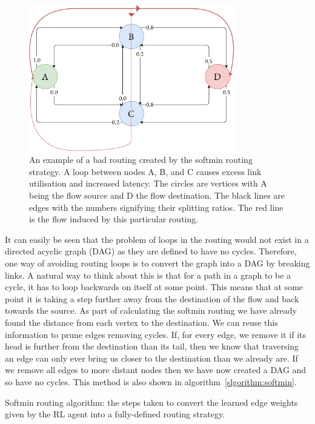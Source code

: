 \begin{figure}
    \centering
    \includegraphics[width=0.8\textwidth]{figures/bad_route.pdf}
    \caption{An example of a bad routing created by the softmin routing strategy. A loop between nodes A, B, and C causes excess link utilisation and increased latency. The circles are vertices with A being the flow source and D the flow destination. The black lines are edges with the numbers signifying their splitting ratios. The red line is the flow induced by this particular routing.}
    \label{fig:bad_route}
\end{figure}

It can easily be seen that the problem of loops in the routing would not exist in a directed acyclic graph (DAG) as they are defined to have no cycles. Therefore, one way of avoiding routing loops is to convert the graph into a DAG by breaking links. A natural way to think about this is that for a path in a graph to be a cycle, it has to loop backwards on itself at some point. This means that at some point it is taking a step further away from the destination of the flow and back towards the source. As part of calculating the softmin routing we have already found the distance from each vertex to the destination. We can reuse this information to prune edges removing cycles. If, for every edge, we remove it if its head is further from the destination than its tail, then we know that traversing an edge can only ever bring us closer to the destination than we already are. If we remove all edges to more distant nodes then we have now created a DAG and so have no cycles. This method is also shown in algorithm~\ref{slgorithm:softmin}.

\begin{algorithm}[t]
\small
\begin{algorithmic}
\EndFunction
\end{algorithmic}
\caption{Softmin routing algorithm: the steps taken to convert the learned edge weights given by the RL agent into a fully-defined routing strategy.}
\label{algorithm:softmin}
\end{algorithm}

